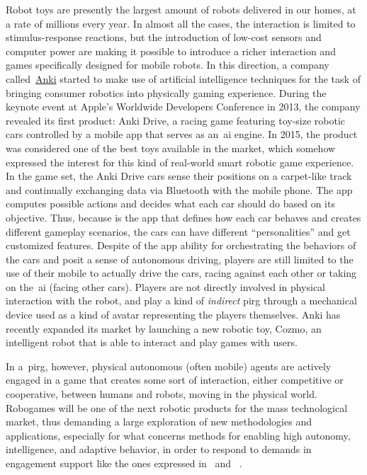 Robot toys are presently the largest amount of robots delivered in our homes, at a rate of millions every year. In almost all the cases, the interaction is limited to stimulus-response reactions, but the introduction of low-cost sensors and computer power are making it possible to introduce a richer interaction and games specifically designed for mobile robots. In this direction, a company called~\href{https://anki.com/en-us}{Anki} started to make use of artificial intelligence techniques for the task of bringing consumer robotics into physically gaming experience. During the keynote event at Apple's Worldwide Developers Conference in 2013, the company revealed its first product: Anki Drive, a racing game featuring toy-size robotic cars controlled by a mobile app that serves as an~\gls{ai} engine. In 2015, the product was considered one of the best toys available in the market, which somehow expressed the interest for this kind of real-world smart robotic game experience. In the game set, the Anki Drive cars sense their positions on a carpet-like track and continually exchanging data via Bluetooth with the mobile phone. The app computes possible actions and decides what each car should do based on its objective. Thus, because is the app that defines how each car behaves and creates different gameplay scenarios, the cars can have different ``personalities'' and get customized features. Despite of the app ability for orchestrating the behaviors of the cars and posit a sense of autonomous driving, players are still limited to the use of their mobile to actually drive the cars, racing against each other or taking on the~\gls{ai} (facing other cars). Players are not directly involved in physical interaction with the robot, and play a kind of \textit{indirect} \gls{pirg} through a mechanical device used as a kind of avatar representing the players themselves. Anki has recently expanded its market by launching a new robotic toy, Cozmo, an intelligent robot that is able to interact and play games with users.

In a~\gls{pirg}, however, physical autonomous (often mobile) agents are actively engaged in a game that creates some sort of interaction, either competitive or cooperative, between humans and robots, moving in the physical world. Robogames will be one of the next robotic products for the mass technological market, thus demanding a large exploration of new methodologies and applications, especially for what concerns methods for enabling high autonomy, intelligence, and adaptive behavior, in order to respond to demands in engagement support like the ones expressed in~\cite{yannakakis_how_2008} and ~\cite{yannakakis_entertainment_2008,yannakakis_real-time_2009}. 

